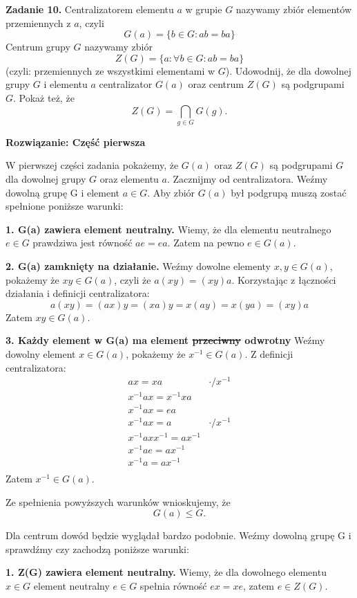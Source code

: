 \documentclass[12pt,a4paper]{article}
\begin{document}
\noindent
\textbf{Zadanie 10.} Centralizatorem elementu \(a\) w grupie \(G\) nazywamy zbiór elementów przemiennych z \(a\), czyli
\[
	G(a) = \{ b \in G : ab = ba\}
\]
Centrum grupy \(G\) nazywamy zbiór
\[
	Z(G) = \{a : \forall b \in G : ab = ba\}
\]
(czyli: przemiennych ze wszystkimi elementami w \(G\)). Udowodnij, że dla dowolnej grupy \(G\) i elementu \(a\) centralizator \(G(a)\) oraz centrum \(Z(G)\) są podgrupami \(G\). Pokaż też, że 
\[
Z(G) = \bigcap_{g\in G} G(g) .
\]

\noindent
\textbf{Rozwiązanie: Część pierwsza} 

W pierwszej części zadania pokażemy, że \(G(a)\) oraz \(Z(G)\) są podgrupami \(G\) dla dowolnej grupy \(G\) oraz elementu \(a\). Zacznijmy od centralizatora. Weźmy dowolną grupę G i element \(a \in G\). Aby zbiór \(G(a)\) był podgrupą muszą zostać spełnione poniższe warunki:

\vskip 0.4cm
\textbf{1. G(a) zawiera element neutralny.} Wiemy, że dla elementu neutralnego \(e \in G\) prawdziwa jest równość \( ae = ea\). Zatem na pewno \(e \in G(a)\).

\vskip 0.4cm
\textbf{2. G(a) zamknięty na działanie.} Weźmy dowolne elementy \(x,y \in G(a)\), pokażemy że \(xy \in G(a)\), czyli że \(a(xy) = (xy)a\). Korzystając z łączności działania i definicji centralizatora:
\[
a(xy) = (ax)y = (xa)y = x(ay) = x(ya) = (xy)a
\]
Zatem \(xy \in G(a)\).

\vskip 0.4cm
\textbf{3. Każdy element w G(a) ma element  \sout{przeciwny} odwrotny} Weźmy dowolny element \(x \in G(a)\), pokażemy że \(x^{-1} \in G(a)\). Z definicji centralizatora:
\[
\begin{array}{cc}
ax = xa & \cdot /x^{-1} \\
x^{-1}ax = x^{-1} x a & \\
x^{-1}ax = ea & \\
x^{-1}ax = a & \cdot /x^{-1} \\
x^{-1}axx^{-1} = ax^{-1} & \\
x^{-1}ae = ax^{-1} & \\
x^{-1}a = ax^{-1} & \\
\end{array}
\]
Zatem \(x^{-1} \in G(a) \).


Ze spełnienia powyższych warunków wnioskujemy, że 
\[
G(a) \leq G.
\]

Dla centrum dowód będzie wyglądał bardzo podobnie. Weźmy dowolną grupę G i sprawdźmy czy zachodzą poniższe warunki:

\vskip 0.4cm
\textbf{1. Z(G) zawiera element neutralny.} Wiemy, że dla dowolnego elementu \(x \in G \) element neutralny \(e \in G \) spełnia równość \( ex = xe \), zatem \( e \in Z(G) \).
\end{document}
